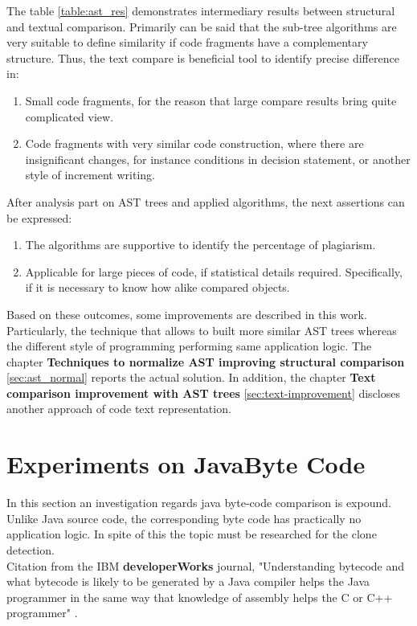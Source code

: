 \documentclass{report}
\begin{document}
The table \ref{table:ast_res} demonstrates intermediary results between structural and textual comparison. Primarily can be said that the sub-tree algorithms are very suitable to define similarity if code fragments have a complementary structure. Thus, the text compare is beneficial tool to identify precise difference in:
\begin{enumerate}
	\item Small code fragments, for the reason that large compare results bring quite complicated view.
	\item Code fragments with very similar code construction, where there are insignificant changes, for instance conditions in decision statement, or another style of increment writing.
\end{enumerate}
After analysis part on AST trees and applied algorithms, the next assertions can be expressed:
\begin{enumerate}
	\item The algorithms are supportive to identify the percentage of plagiarism.
	\item Applicable for large pieces of code, if statistical details required. Specifically, if it is necessary to know how alike compared objects.
\end{enumerate}
Based on these outcomes, some improvements are described in this work. Particularly, the technique that allows to built more similar AST trees whereas the different style of programming performing same application logic. The chapter \textbf{Techniques to normalize AST improving structural comparison} \ref{sec:ast_normal} reports the actual solution. In addition, the chapter \textbf{Text comparison improvement with AST trees} \ref{sec:text-improvement} discloses another approach of code text representation.

\section{Experiments on JavaByte Code}
\label{sec: java-code-experiments}

In this section an investigation regards java byte-code comparison is expound. Unlike Java source code, the corresponding byte code has practically no application logic. In spite of this the topic must be researched for the clone detection. \\
Citation from the IBM \textbf{developerWorks} journal, "Understanding bytecode and what bytecode is likely to be generated by a Java compiler helps the Java programmer in the same way that knowledge of assembly helps the C or C++ programmer" \cite{ibm}. 
\end{document}
